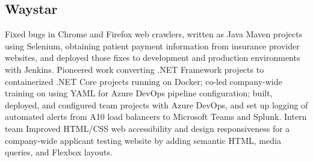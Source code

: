 \subsection{Waystar}
{Fixed bugs in Chrome and Firefox web crawlers, written as Java Maven projects using Selenium, obtaining patient payment information from insurance provider websites, and deployed those fixes to development and production environments with Jenkins.
}
{Pioneered work converting .NET Framework projects to containerized .NET Core projects running on Docker; co-led company-wide training on using YAML for Azure DevOps pipeline configuration; built, deployed, and configured team projects with Azure DevOps, and set up logging of automated alerts from A10 load balancers to Microsoft Teams and Splunk.
}
{Intern team}
{}
{Improved HTML/CSS web accessibility and design responsiveness for a company-wide applicant testing website by adding semantic HTML, media queries, and Flexbox layouts. }
